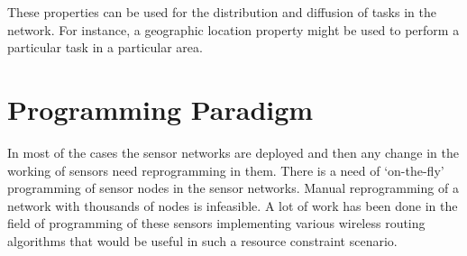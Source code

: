 \documentclass[twocolumn]{article}
\begin{document}
These properties can be used for the distribution and diffusion of tasks in the network. For instance, a geographic location property might be used to perform a particular task in a particular area.\\


\section{Programming Paradigm}

In most of the cases the sensor networks are deployed and then any change in the working of sensors need reprogramming in them. There is a need of ‘on-the-fly’ programming of sensor nodes in the sensor networks. Manual reprogramming of a network with thousands of nodes is infeasible. A lot of work has been done in the field of programming of these sensors implementing various wireless routing algorithms that would be useful in such a resource constraint scenario.
\end{document}
